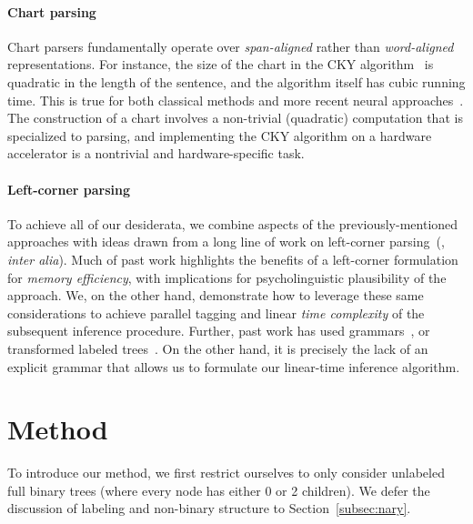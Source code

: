 \documentclass[11pt,a4paper]{article}
\begin{document}
\paragraph{Chart parsing} Chart parsers fundamentally operate over \emph{span-aligned} rather than \emph{word-aligned} representations.
For instance, the size of the chart in the CKY algorithm~\citep{cocke-1970-programming,kasami-1966-efficient,younger-1967-recognition} is quadratic in the length of the sentence, and the algorithm itself has cubic running time.
This is true for both classical methods and more recent neural approaches~\citep{durrett-klein-2015-neural,stern-etal-2017-minimal}. The construction of a chart involves a non-trivial (quadratic) computation that is specialized to parsing, and implementing the CKY algorithm on a hardware accelerator is a nontrivial and hardware-specific task.

\paragraph{Left-corner parsing}
To achieve all of our desiderata, we combine aspects of the previously-mentioned approaches with ideas drawn from a long line of work on left-corner parsing~(\citealp{rosenkrantz-lewis-1970-deterministic,nijholt-1979-structure,vanschijndel-etal-2013-model,noji-etal-2016-using,shain-etal-2016-memory-bounded}, \emph{inter alia}). Much of past work highlights the benefits of a left-corner formulation for \emph{memory efficiency}, with implications for psycholinguistic plausibility of the approach. We, on the other hand, demonstrate how to leverage these same considerations to achieve parallel tagging and linear \emph{time complexity} of the subsequent inference procedure.
Further, past work has used grammars~\citep{rosenkrantz-lewis-1970-deterministic}, or transformed labeled trees~\citep{johnson-1998-finite-state,schuler-etal-2010-broad}. On the other hand, it is precisely the lack of an explicit grammar that allows us to formulate our linear-time inference algorithm.


\section{Method}

To introduce our method, we first restrict ourselves to only consider unlabeled full binary trees (where every node has either 0 or 2 children).
We defer the discussion of labeling and non-binary structure to Section~\ref{subsec:nary}.
\end{document}

